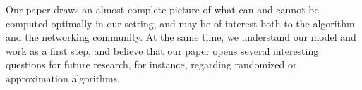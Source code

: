 \documentclass[9pt]{sigcomm-alternate}
\newcommand{\maciek}[1]{\textcolor{brown}{maciek: #1}}
\begin{document}




Our paper draws an almost complete picture of what can and cannot be
computed optimally in our setting, and may be of interest both to the algorithm
and the networking community. At the same time, we understand our model and work
as a first step, and believe that our paper opens several interesting
questions for future research, for instance, regarding randomized
or approximation algorithms.


%


\end{document}
